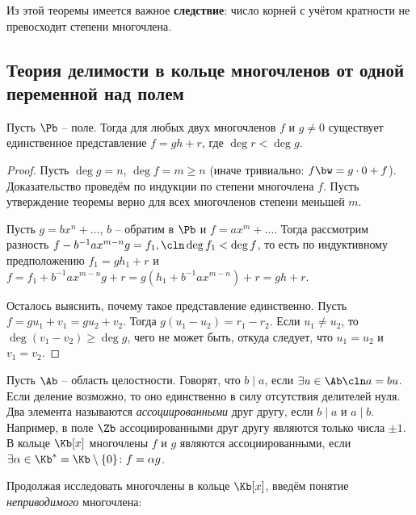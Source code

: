 Из этой теоремы имеется важное {\bfseries следствие}: число корней с учётом кратности не превосходит степени многочлена.

\subsection[Теория делимости многочленов]{Теория делимости в кольце многочленов от одной переменной над полем}

\begin{theorem}
  Пусть $\Pb$ -- поле. Тогда для любых двух многочленов $f$ и $g\ne0$
  существует единственное представление $f=gh+r$, где $\deg r<\deg
  g$.
\end{theorem}
\begin{proof}
  Пусть $\deg g=n$, $\deg f=m\ge n$ (иначе тривиально: $f\bw=g\cdot0+f$). Доказательство проведём по индукции по степени многочлена $f$. Пусть утверждение теоремы верно для всех многочленов степени меньшей $m$.

  Пусть $g = bx^n+\dots$, $b$ -- обратим в $\Pb$ и $f=ax^m+\dots$. Тогда рассмотрим разность $f-b^{-1}ax^{m-n}g = f_1,\cln\deg f_1<\deg f$, то есть по индуктивному предположению $f_1=gh_1+r$ и $f=f_1+b^{-1}ax^{m-n}g+r=g(h_1+b^{-1}ax^{m-n})+r=gh+r$.

  Осталось выяснить, почему такое представление единственно. Пусть $f=gu_1+v_1=gu_2+v_2$. Тогда $g(u_1-u_2)=r_1-r_2$. Если $u_1\ne u_2$, то $\deg (v_1-v_2)\ge\deg g$, чего не может быть, откуда следует, что $u_1=u_2$ и $v_1=v_2$.
\end{proof}

Пусть $\Ab$ -- область целостности. Говорят, что $b\mid a$, если $\exists u\in\Ab\cln a=bu$. Если деление возможно, то оно единственно в силу отсутствия делителей нуля. Два элемента называются \emph{ассоциированными} друг другу, если $b\mid a$ и $a\mid b$. Например, в поле $\Zb$ ассоциированными друг другу являются только числа $\pm1$. В кольце $\Kb[x]$ многочлены $f$ и $g$ являются ассоциированными, если $\exists\alpha\in\Kb^*=\Kb\setminus\{0\}\colon f=\alpha g$.

Продолжая исследовать многочлены в кольце $\Kb[x]$, введём понятие \emph{неприводимого} многочлена:

